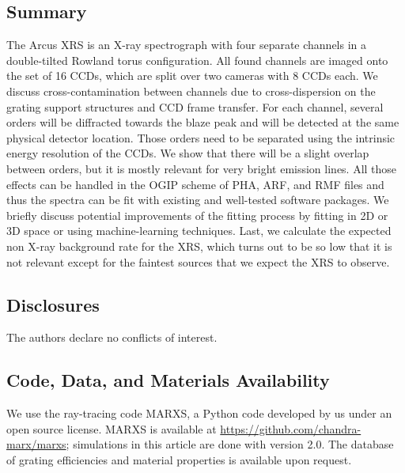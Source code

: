 \documentclass[12pt]{spieman}  %
\begin{document}
\begin{spacing}{2}
\section{Summary}
\label{sect:summary}
The Arcus XRS is an X-ray spectrograph with four separate channels in a double-tilted Rowland torus configuration. All found channels are imaged onto the set of 16 CCDs, which are split over two cameras with 8 CCDs each. We discuss cross-contamination between channels due to cross-dispersion on the grating support structures and CCD frame transfer. For each channel, several orders will be diffracted towards the blaze peak and will be detected at the same physical detector location. Those orders need to be separated using the intrinsic energy resolution of the CCDs. We show that there will be a slight overlap between orders, but it is mostly relevant for very bright emission lines. All those effects can be handled in the OGIP scheme of PHA, ARF, and RMF files and thus the spectra can be fit with existing and well-tested software packages. We briefly discuss potential improvements of the fitting process by fitting in 2D or 3D space or using machine-learning techniques. Last, we calculate the expected non X-ray background rate for the XRS, which turns out to be so low that it is not relevant except for the faintest sources that we expect the XRS to observe.



\subsection*{Disclosures}
The authors declare no conflicts of interest.


\subsection* {Code, Data, and Materials Availability}
We use the ray-tracing code MARXS\cite{2017AJ....154..243G,marxs2.0}, a Python code developed by us under an open source license. MARXS is available at \url{https://github.com/chandra-marx/marxs}; simulations in this article are done with version 2.0. The database of grating efficiencies and material properties is available upon request.





\end{spacing}
\end{document}
